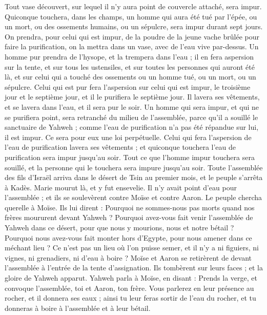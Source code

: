 \begin{multicols}{2}
Tout vase découvert, sur lequel il n'y aura point de couvercle attaché, sera impur.
Quiconque touchera, dans les champs, un homme qui aura été tué par l'épée, ou un mort, ou des ossements humains, ou un sépulcre, sera impur durant sept jours.
On prendra, pour celui qui est impur, de la poudre de la jeune vache brûlée pour faire la purification, on la mettra dans un vase, avec de l'eau vive par-dessus.
Un homme pur prendra de l'hysope, et la trempera dans l'eau ; il en fera aspersion sur la tente, et sur tous les ustensiles, et sur toutes les personnes qui auront été là, et sur celui qui a touché des ossements ou un homme tué, ou un mort, ou un sépulcre.
Celui qui est pur fera l’aspersion sur celui qui est impur, le troisième jour et le septième jour, et il le purifiera le septième jour. Il lavera ses vêtements, et se lavera dans l'eau, et il sera pur le soir.
Un homme qui sera impur, et qui ne se purifiera point, sera retranché du milieu de l'assemblée, parce qu'il a souillé le sanctuaire de Yahweh ; comme l'eau de purification n'a pas été répandue sur lui, il est impur.
Ce sera pour eux une loi perpétuelle. Celui qui fera l’aspersion de l'eau de purification lavera ses vêtements ; et quiconque touchera l'eau de purification sera impur jusqu'au soir.
Tout ce que l'homme impur touchera sera souillé, et la personne qui le touchera sera impure jusqu'au soir.
\VerseOne{}Toute l’assemblée des fils d'Israël arriva dans le désert de Tsin au premier mois, et le peuple s’arrêta à Kadès. Marie mourut là, et y fut ensevelie.
Il n’y avait point d'eau pour l'assemblée ; et ils se soulevèrent contre Moïse et contre Aaron.
Le peuple chercha querelle à Moïse. Ils lui dirent : Pourquoi ne sommes-nous pas morts quand nos frères moururent devant Yahweh ?
Pourquoi avez-vous fait venir l'assemblée de Yahweh dans ce désert, pour que nous y mourions, nous et notre bétail ?
Pourquoi nous avez-vous fait monter hors d'Egypte, pour nous amener dans ce méchant lieu ? Ce n’est pas un lieu où l’on puisse semer, et il n’y a ni figuiers, ni vignes, ni grenadiers, ni d'eau à boire ?
Moïse et Aaron se retirèrent de devant l'assemblée à l'entrée de la tente d'assignation. Ils tombèrent sur leurs faces ; et la gloire de Yahweh apparut.
Yahweh parla à Moïse, en disant :
Prends la verge, et convoque l'assemblée, toi et Aaron, ton frère. Vous parlerez en leur présence au rocher, et il donnera ses eaux ; ainsi tu leur feras sortir de l'eau du rocher, et tu donneras à boire à l'assemblée et à leur bétail.

\end{multicols}

